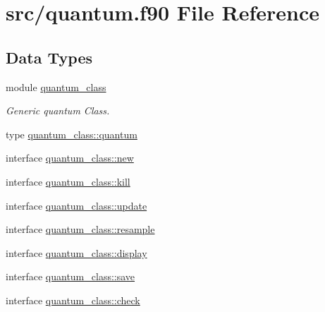 \hypertarget{quantum_8f90}{\section{src/quantum.f90 File Reference}
\label{quantum_8f90}
}
\subsection*{Data Types}
\begin{DoxyCompactItemize}
\item 
module \hyperlink{classquantum__class}{quantum\+\_\+class}
\begin{DoxyCompactList}\small\item\em Generic quantum Class. \end{DoxyCompactList}\item 
type \hyperlink{structquantum__class_1_1quantum}{quantum\+\_\+class\+::quantum}
\item 
interface \hyperlink{interfacequantum__class_1_1new}{quantum\+\_\+class\+::new}
\item 
interface \hyperlink{interfacequantum__class_1_1kill}{quantum\+\_\+class\+::kill}
\item 
interface \hyperlink{interfacequantum__class_1_1update}{quantum\+\_\+class\+::update}
\item 
interface \hyperlink{interfacequantum__class_1_1resample}{quantum\+\_\+class\+::resample}
\item 
interface \hyperlink{interfacequantum__class_1_1display}{quantum\+\_\+class\+::display}
\item 
interface \hyperlink{interfacequantum__class_1_1save}{quantum\+\_\+class\+::save}
\item 
interface \hyperlink{interfacequantum__class_1_1check}{quantum\+\_\+class\+::check}
\end{DoxyCompactItemize}

